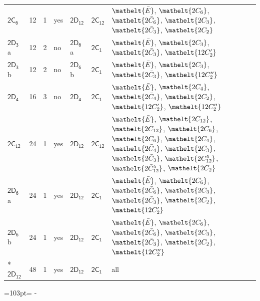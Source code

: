 \documentclass[10pt,a4paper]{article}
\newcommand{\needspace}[1]{\par\penalty-100\begingroup\dimen0=#1\relax\dimen2=\pagegoal
  \advance\dimen2-\pagetotal\ifdim\dimen0>\dimen2\relax\ifdim\dimen2>0pt\vfil\break\fi\fi
  \endgroup}
\numberwithin{equation}{section}
\newcommand{\eltfont}[1]{{\let\sigma\eltsigma\mathelt{#1}}}
\newcommand{\grp}[1]{\mathsf{#1}}
\newcommand{\cls}[1]{\eltfont{#1}}
\newcommand{\clsletter}[1]{\,{\scriptsize\color{black!55}#1}}
\newcommand{\barred}[1]{\bar{#1}}
\newlength{\fillwidth}\newlength{\cellwidth}\newlength{\colwidth}
\begin{document}
{\begin{longtable}{@{}lrrlll>{\RaggedRight\arraybackslash}p{\fillwidth}@{}}
\href{2C6.pdf}{$\grp{2C_{6}}$} & 12 & 1 & yes & \href{2D12.pdf}{$\grp{2D_{12}}$} & \href{2C12.pdf}{$\grp{2C_{12}}$} & $\cls{\barred{E}}$, $\cls{2C_{6}}$, $\cls{2\barred{C}_{6}}$, $\cls{2C_{3}}$, $\cls{2\barred{C}_{3}}$, $\cls{2C_{2}}$\\
\href{2D3.pdf}{$\grp{2D_{3}}$}\clsletter{a} & 12 & 2 & no & \href{2D6.pdf}{$\grp{2D_{6}}$}\clsletter{a} & \href{2C1.pdf}{$\grp{2C_{1}}$} & $\cls{\barred{E}}$, $\cls{2C_{3}}$, $\cls{2\barred{C}_{3}}$, $\cls{12C_{2}'}$\\
\href{2D3.pdf}{$\grp{2D_{3}}$}\clsletter{b} & 12 & 2 & no & \href{2D6.pdf}{$\grp{2D_{6}}$}\clsletter{b} & \href{2C1.pdf}{$\grp{2C_{1}}$} & $\cls{\barred{E}}$, $\cls{2C_{3}}$, $\cls{2\barred{C}_{3}}$, $\cls{12C_{2}''}$\\
\href{2D4.pdf}{$\grp{2D_{4}}$} & 16 & 3 & no & \href{2D4.pdf}{$\grp{2D_{4}}$} & \href{2C1.pdf}{$\grp{2C_{1}}$} & $\cls{\barred{E}}$, $\cls{2C_{4}}$, $\cls{2\barred{C}_{4}}$, $\cls{2C_{2}}$, $\cls{12C_{2}'}$, $\cls{12C_{2}''}$\\
\href{2C12.pdf}{$\grp{2C_{12}}$} & 24 & 1 & yes & \href{2D12.pdf}{$\grp{2D_{12}}$} & \href{2C12.pdf}{$\grp{2C_{12}}$} & $\cls{\barred{E}}$, $\cls{2C_{12}}$, $\cls{2\barred{C}_{12}}$, $\cls{2C_{6}}$, $\cls{2\barred{C}_{6}}$, $\cls{2C_{4}}$, $\cls{2\barred{C}_{4}}$, $\cls{2C_{3}}$, $\cls{2\barred{C}_{3}}$, $\cls{2C_{12}^{5}}$, $\cls{2\barred{C}_{12}^{5}}$, $\cls{2C_{2}}$\\
\href{2D6.pdf}{$\grp{2D_{6}}$}\clsletter{a} & 24 & 1 & yes & \href{2D12.pdf}{$\grp{2D_{12}}$} & \href{2C1.pdf}{$\grp{2C_{1}}$} & $\cls{\barred{E}}$, $\cls{2C_{6}}$, $\cls{2\barred{C}_{6}}$, $\cls{2C_{3}}$, $\cls{2\barred{C}_{3}}$, $\cls{2C_{2}}$, $\cls{12C_{2}'}$\\
\href{2D6.pdf}{$\grp{2D_{6}}$}\clsletter{b} & 24 & 1 & yes & \href{2D12.pdf}{$\grp{2D_{12}}$} & \href{2C1.pdf}{$\grp{2C_{1}}$} & $\cls{\barred{E}}$, $\cls{2C_{6}}$, $\cls{2\barred{C}_{6}}$, $\cls{2C_{3}}$, $\cls{2\barred{C}_{3}}$, $\cls{2C_{2}}$, $\cls{12C_{2}''}$\\*
\href{2D12.pdf}{$\grp{2D_{12}}$} & 48 & 1 & yes & \href{2D12.pdf}{$\grp{2D_{12}}$} & \href{2C1.pdf}{$\grp{2C_{1}}$} & all\\
\bottomrule\end{longtable}}
\needspace{103pt}
\end{document}

